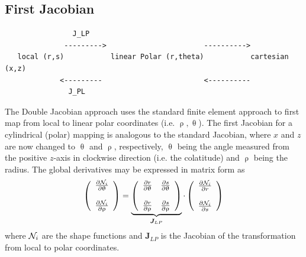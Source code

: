 \subsection{First Jacobian}


\begin{verbatim}
                J_LP
              --------->                       ---------->
   local (r,s)           linear Polar (r,theta)           cartesian (x,z)
             <---------                        <----------
               J_PL
\end{verbatim}


The Double Jacobian approach uses the standard finite element approach to first map 
from local to linear polar coordinates (i.e. $\uprho,\uptheta$). The first Jacobian for 
a cylindrical (polar) mapping is analogous to the standard Jacobian, where $x$ and $z$ 
are now changed to $\uptheta$ and $\uprho$, respectively, $\uptheta$ being the angle 
measured from the positive $z$-axis in clockwise direction (i.e. the colatitude) 
and $\uprho$ being the radius. The global derivatives may be expressed in matrix form as
\begin{equation}
\left(
\begin{array}{c}
\frac{\partial {\mathcal{N}}_i}{\partial \uptheta} \\ \\
\frac{\partial {\mathcal{N}}_i}{\partial \uprho} 
\end{array}
\right)
= 
\underbrace{\left(
\begin{array}{cc}
\frac{\partial r}{\partial \uptheta}  & 
\frac{\partial s}{\partial \uptheta}   \\ \\
\frac{\partial r}{\partial \uprho}  & 
\frac{\partial s}{\partial \uprho}  
\end{array}
\right)}_{{\bm J}_{LP}}
\cdot
\left(
\begin{array}{c}
\frac{\partial {\mathcal{N}}_i}{\partial r} \\ \\
\frac{\partial {\mathcal{N}}_i}{\partial s} 
\end{array}
\right)
\label{eq:DJ1}
\end{equation}
where ${\mathcal{N}}_i$ are the shape functions and ${\bm J}_{LP}$ 
is the Jacobian of the transformation from local to polar coordinates.


